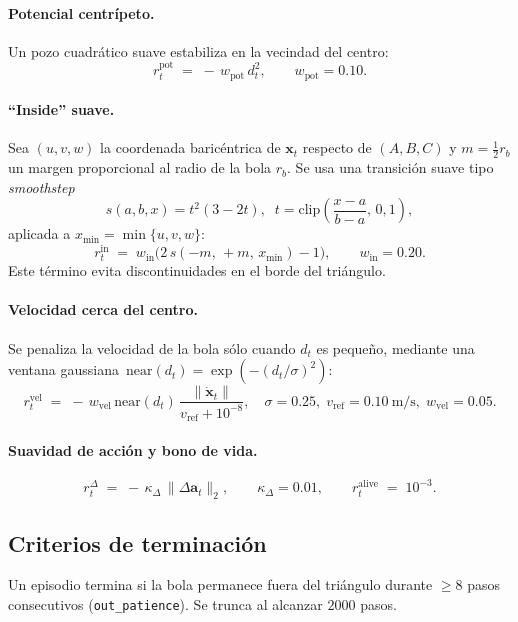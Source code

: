 \documentclass[conference]{IEEEtran}
\begin{document}
\paragraph{Potencial centrípeto.}
Un pozo cuadrático suave estabiliza en la vecindad del centro:
\begin{equation}
r_t^{\mathrm{pot}} \;=\; -\,w_{\mathrm{pot}}\, d_t^2, \qquad w_{\mathrm{pot}}=0.10.
\end{equation}

\paragraph{``Inside'' suave.}
Sea $(u,v,w)$ la coordenada baricéntrica de $\mathbf{x}_t$ respecto de $(A,B,C)$ y
$m=\tfrac{1}{2}r_b$ un margen proporcional al radio de la bola $r_b$.
Se usa una transición suave tipo \emph{smoothstep}
\[
s(a,b,x)=t^2(3-2t),\;\; t=\mathrm{clip}\!\left(\frac{x-a}{b-a},\,0,1\right),
\]
aplicada a $x_{\min}=\min\{u,v,w\}$:
\begin{equation}
r_t^{\mathrm{in}} \;=\; w_{\mathrm{in}}\bigl(2\,s(-m,\,+m,\,x_{\min})-1\bigr),
\qquad w_{\mathrm{in}}=0.20 .
\end{equation}
Este término evita discontinuidades en el borde del triángulo.

\paragraph{Velocidad cerca del centro.}
Se penaliza la velocidad de la bola sólo cuando $d_t$ es pequeño,
mediante una ventana gaussiana $\,\mathrm{near}(d_t)=\exp(-(d_t/\sigma)^2)$:
\begin{equation}
r_t^{\mathrm{vel}} \;=\; -\,w_{\mathrm{vel}}\,
\mathrm{near}(d_t)\,\frac{\|\dot{\mathbf{x}}_t\|}{v_{\mathrm{ref}}+10^{-8}},
\quad \sigma=0.25,\; v_{\mathrm{ref}}=0.10~\mathrm{m/s},\;
w_{\mathrm{vel}}=0.05 .
\end{equation}

\paragraph{Suavidad de acción y bono de vida.}
\begin{equation}
r_t^{\Delta} \;=\; -\,\kappa_{\Delta}\,\|\Delta\mathbf{a}_t\|_2,
\qquad \kappa_{\Delta}=0.01,
\qquad
r_t^{\mathrm{alive}} \;=\; 10^{-3}.
\end{equation}


\subsection{Criterios de terminación}
Un episodio termina si la bola permanece fuera del triángulo durante $\geq 8$ pasos consecutivos (\texttt{out\_patience}). Se trunca al alcanzar $2000$ pasos.
\end{document}
